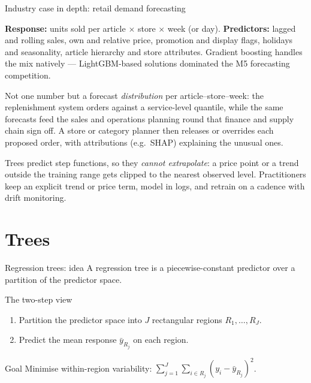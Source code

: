 \documentclass[aspectratio=169,11pt]{beamer}
\begin{document}
\begin{frame}{Industry case in depth: retail demand forecasting}
  \footnotesize
  \begin{industry}
    \textbf{Response:} units sold per article $\times$ store $\times$ week (or day). \textbf{Predictors:} lagged and rolling sales, own and relative price, promotion and display flags, holidays and seasonality, article hierarchy and store attributes. Gradient boosting handles the mix natively --- LightGBM-based solutions dominated the M5 forecasting competition.
  \end{industry}
  \begin{readme}
    Not one number but a forecast \emph{distribution} per article--store--week: the replenishment system orders against a service-level quantile, while the same forecasts feed the sales and operations planning round that finance and supply chain sign off. A store or category planner then releases or overrides each proposed order, with attributions (e.g.\ SHAP) explaining the unusual ones.
  \end{readme}
  \begin{takeaway}
    Trees predict step functions, so they \emph{cannot extrapolate}: a price point or a trend outside the training range gets clipped to the nearest observed level. Practitioners keep an explicit trend or price term, model in logs, and retrain on a cadence with drift monitoring.
  \end{takeaway}
\end{frame}


\section{Trees}

\begin{frame}{Regression trees: idea}
  A regression tree is a piecewise-constant predictor over a partition
  of the predictor space.
  \begin{block}{The two-step view}
    \begin{enumerate}
      \item Partition the predictor space into $J$ rectangular regions
            $R_1, \ldots, R_J$.
      \item Predict the mean response $\bar y_{R_j}$ on each region.
    \end{enumerate}
  \end{block}
  \begin{block}{Goal}
    Minimise within-region variability:
    $\sum_{j = 1}^J \sum_{i \in R_j} (y_i - \bar y_{R_j})^2$.
  \end{block}
\end{frame}
\end{document}
